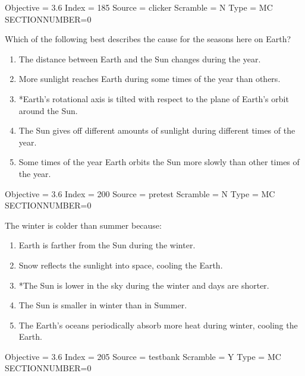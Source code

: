 \documentclass[11pt]{article}
\begin{document}
\begin{enumerate}
\begin{minipage}{\textwidth}
\begin{minipage}{\textwidth}
Objective = 3.6
Index = 185
Source = clicker
Scramble = N
Type = MC
SECTIONNUMBER=0
\end{minipage}
\end{minipage}
\vskip 0.20in

\begin{minipage}{\textwidth}
\begin{minipage}{\textwidth}
\item Which of the following best describes the cause for the seasons here on Earth?
\begin{enumerate} 
\setlength{\itemsep}{1pt} 
\setlength{\parskip}{0pt} 
\setlength{\parsep}{0pt}
\setlength{\multicolsep}{1pt} 
\item The distance between Earth and the Sun changes during the year.
\item More sunlight reaches Earth during some times of the year than others.
\item *Earth’s rotational axis is tilted with respect to the plane of Earth’s orbit around the Sun.
\item The Sun gives off different amounts of sunlight during different times of the year.
\item Some times of the year Earth orbits the Sun more slowly than other times of the year.
\end{enumerate} 
Objective = 3.6
Index = 200
Source = pretest
Scramble = N
Type = MC
SECTIONNUMBER=0
\end{minipage}
\end{minipage}
\vskip 0.20in

\begin{minipage}{\textwidth}
\begin{minipage}{\textwidth}
\item The winter is colder than summer because:
\begin{enumerate} 
\setlength{\itemsep}{1pt} 
\setlength{\parskip}{0pt} 
\setlength{\parsep}{0pt}
\setlength{\multicolsep}{1pt} 
\item Earth is farther from the Sun during the winter.
\item Snow reflects the sunlight into space, cooling the Earth.
\item *The Sun is lower in the sky during the winter and days are shorter.
\item The Sun is smaller in winter than in Summer.
\item The Earth's oceans periodically absorb more heat during winter, cooling the Earth.
\end{enumerate} 
Objective = 3.6
Index = 205
Source = testbank
Scramble = Y
Type = MC
SECTIONNUMBER=0
\end{minipage}
\end{minipage}
\vskip 0.20in


\end{enumerate}
\end{document}
